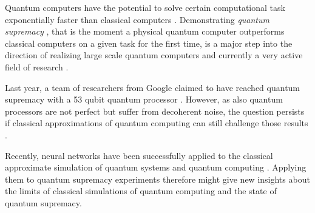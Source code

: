 Quantum computers have the potential to solve certain computational task exponentially faster
than classical computers \cite{feynman1999simulating,shor1999polynomial}. Demonstrating \textit{quantum supremacy} 
\cite{preskill2012quantum}, that is the moment a physical quantum computer outperforms classical 
computers on a given task for the first time, is a major step into the direction of realizing 
large scale quantum computers and currently a very active field of research \cite{google2019supremacy, Neill_2018, aaronson2016complexitytheoretic, boul2018quantum, aaronson2010computational, boixo2018characterizing}.

Last year, a team of researchers from Google claimed to have reached quantum supremacy with a 53 qubit
quantum processor \cite{google2019supremacy}. However, as also quantum processors are not perfect but suffer from decoherent noise, the 
question persists if classical approximations of quantum computing can still challenge those results \cite{zhou2020limits}. 

Recently, neural networks have been successfully applied to the classical approximate simulation of quantum systems and
quantum computing \cite{Carleo_2017,jnsson2018neuralnetwork}. Applying them to quantum supremacy experiments therefore might give new insights about the
limits of classical simulations of quantum computing and the state of quantum supremacy.

